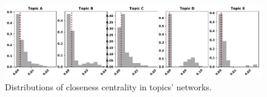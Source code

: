 \documentclass{article}
\theoremstyle{definition}
\begin{document}
\begin{figure}[!hbtp]
    \centering
    \includegraphics[width=\textwidth]{topics_closeness_distributions.pdf}
    \caption{Distributions of closeness centrality in topics' networks.}
    \label{fig:cc_distributions_topics}
\end{figure}
\end{document}
